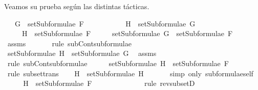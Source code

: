 \begin{isabellebody}
\begin{isamarkuptext}
  Veamos su prueba según las distintas tácticas.%
\end{isamarkuptext}\isamarkuptrue%
\isamarkupfalse%
\isanewline
\ \ \ {\isachardoublequoteopen}G\ {\isasymin}\ setSubformulae\ F{\isachardoublequoteclose}\ \isanewline
\ \ \ \ \ \ \ \ \ \ {\isachardoublequoteopen}H\ {\isasymin}\ setSubformulae\ G{\isachardoublequoteclose}\isanewline
\ \ \ \ \ {\isachardoublequoteopen}H\ {\isasymin}\ setSubformulae\ F{\isachardoublequoteclose}\isanewline
%
\isadelimproof
%
\endisadelimproof
%
\isatagproof
{}\isamarkupfalse%
\ {\isacharminus}\isanewline
\ \ \isamarkupfalse%
\ {}{\isacharcolon}{\isachardoublequoteopen}setSubformulae\ G\ {\isasymsubseteq}\ setSubformulae\ F{\isachardoublequoteclose}\ \isamarkupfalse%
\ assms{\isacharparenleft}{}{\isacharparenright}\ \isanewline
\ \ \ \ \isamarkupfalse%
\ {\isacharparenleft}rule\ subContsubformulae{\isacharparenright}\isanewline
\ \ \isamarkupfalse%
\ {\isachardoublequoteopen}setSubformulae\ H\ {\isasymsubseteq}\ setSubformulae\ G{\isachardoublequoteclose}\ \isamarkupfalse%
\ assms{\isacharparenleft}{}{\isacharparenright}\ \isanewline
\ \ \ \ \isamarkupfalse%
\ {\isacharparenleft}rule\ subContsubformulae{\isacharparenright}\isanewline
\ \ \isamarkupfalse%
\ \isamarkupfalse%
\ {}{\isacharcolon}{\isachardoublequoteopen}setSubformulae\ H\ {\isasymsubseteq}\ setSubformulae\ F{\isachardoublequoteclose}\ \isamarkupfalse%
\ {}\ \isanewline
\ \ \ \ \isamarkupfalse%
\ {\isacharparenleft}rule\ subset{\isacharunderscore}trans{\isacharparenright}\isanewline
\ \ \isamarkupfalse%
\ {\isachardoublequoteopen}H\ {\isasymin}\ setSubformulae\ H{\isachardoublequoteclose}\ \isanewline
\ \ \ \ \isamarkupfalse%
\ {\isacharparenleft}simp\ only{\isacharcolon}\ subformulae{\isacharunderscore}self{\isacharparenright}\isanewline
\ \ \isamarkupfalse%
\ \isamarkupfalse%
\ {\isachardoublequoteopen}H\ {\isasymin}\ setSubformulae\ F{\isachardoublequoteclose}\ \isanewline
\ \ \ \ \isamarkupfalse%
\ {}\ \isanewline
\ \ \ \ \isamarkupfalse%
\ {\isacharparenleft}rule\ rev{\isacharunderscore}subsetD{\isacharparenright}\isanewline
{}\isamarkupfalse%
%
\endisatagproof
{\isafoldproof}%
%
\isadelimproof
\isanewline

\end{isabellebody}
